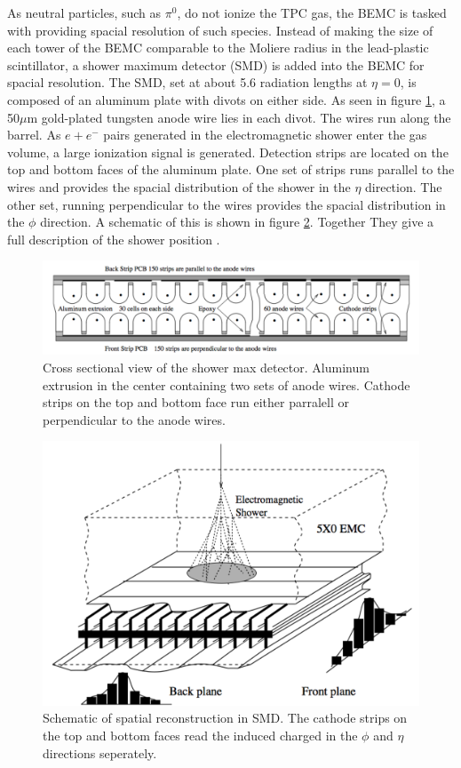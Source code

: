 \documentclass[abstract = on,listof=totoc, bibliography=totoc]{scrreprt}
\begin{document}
As neutral particles, such as $\pi^0$, do not ionize the TPC gas, the BEMC is tasked with providing spacial resolution of such species. Instead of making the size of each tower of the BEMC comparable to the Moliere radius in the lead-plastic scintillator, a shower maximum detector (SMD) is added into the BEMC for spacial resolution. The SMD, set at about 5.6 radiation lengths at $\eta=0$, is composed of an aluminum plate with divots on either side. As seen in figure \ref{fig:SMD2}, a 50$\mu$m gold-plated tungsten anode wire lies in each divot. The wires run along the barrel. As $e+e^-$ pairs generated in the electromagnetic shower enter the gas volume, a large ionization signal is generated. Detection strips are located on the top and bottom faces of the aluminum plate. One set of strips runs parallel to the wires and provides the spacial distribution of the shower in the $\eta$ direction. The other set, running perpendicular to the wires provides the spacial distribution in the $\phi$ direction. A schematic of this is shown in figure \ref{fig:SMD1}. Together They give a full description of the shower position \cite{BEMC}.

\begin{figure}
\begin{center}
\includegraphics[width = .6\textwidth]{SMD2}
\caption[Shower Maximum Detector cross sectional view]{Cross sectional view of the shower max detector. Aluminum extrusion in the center containing two sets of anode wires. Cathode strips on the top and bottom face run either parralell or perpendicular to the anode wires.}
\label{fig:SMD2}
\end{center}
\end{figure}

\begin{figure}
\begin{center}
\includegraphics[width = .6\textwidth]{SMD1}
\caption[Spatial reconstruction in the SMD]{Schematic of spatial reconstruction in SMD. The cathode strips on the top and bottom faces read the induced charged in the $\phi$ and $\eta$ directions seperately.}
\label{fig:SMD1}
\end{center}
\end{figure}
\end{document}
